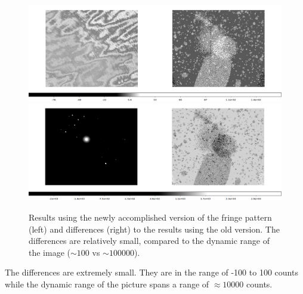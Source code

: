 \documentclass[11pt,a4paper,twoside]{article}
\begin{document}
\begin{figure}
\centering
\includegraphics[width=\linewidth]{./pic/diff_fringe}
\includegraphics[width=\linewidth]{./pic/diff_result}
\caption{Results using the newly accomplished version of the fringe pattern (left)
        and differences (right) to the results using the old version. The differences
        are relatively small, compared to the dynamic range of the image ($\sim
        100$ vs $\sim 100000$).}
\label{fig:df}
\end{figure}

The differences are extremely small. They are in the range of -100 to 100 counts
while the dynamic range of the picture spans a range of $\approx 10000$ counts.
\end{document}
